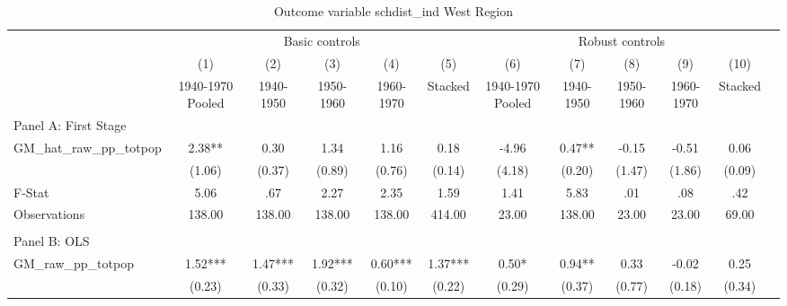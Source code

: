  \begin{table}[htbp]\centering {} \begin{threeparttable} \caption{Outcome variable schdist\_ind West Region} \begin{tabular}{l*{11}{c}} \toprule
          &\multicolumn{5}{c}{Basic controls}                                   &\multicolumn{5}{c}{Robust controls}                                  \\\cmidrule(lr){2-6}\cmidrule(lr){7-11}
          &\multicolumn{1}{c}{(1)}&\multicolumn{1}{c}{(2)}&\multicolumn{1}{c}{(3)}&\multicolumn{1}{c}{(4)}&\multicolumn{1}{c}{(5)}&\multicolumn{1}{c}{(6)}&\multicolumn{1}{c}{(7)}&\multicolumn{1}{c}{(8)}&\multicolumn{1}{c}{(9)}&\multicolumn{1}{c}{(10)}\\
          &\multicolumn{1}{c}{1940-1970 Pooled}&\multicolumn{1}{c}{1940-1950}&\multicolumn{1}{c}{1950-1960}&\multicolumn{1}{c}{1960-1970}&\multicolumn{1}{c}{Stacked}&\multicolumn{1}{c}{1940-1970 Pooled}&\multicolumn{1}{c}{1940-1950}&\multicolumn{1}{c}{1950-1960}&\multicolumn{1}{c}{1960-1970}&\multicolumn{1}{c}{Stacked}\\
\cmidrule(lr){1-11}
\multicolumn{10}{l}{Panel A: First Stage}\\
\cmidrule(lr){1-11}
GM\_hat\_raw\_pp\_totpop&      2.38** &      0.30   &      1.34   &      1.16   &      0.18   &     -4.96   &      0.47** &     -0.15   &     -0.51   &      0.06   \\
          &    (1.06)   &    (0.37)   &    (0.89)   &    (0.76)   &    (0.14)   &    (4.18)   &    (0.20)   &    (1.47)   &    (1.86)   &    (0.09)   \\
\midrule
F-Stat    &      5.06   &       .67   &      2.27   &      2.35   &      1.59   &      1.41   &      5.83   &       .01   &       .08   &       .42   \\
Observations&    138.00   &    138.00   &    138.00   &    138.00   &    414.00   &     23.00   &    138.00   &     23.00   &     23.00   &     69.00   \\
\cmidrule[\heavyrulewidth](lr){1-11} \\ \cmidrule[\heavyrulewidth](lr){1-11}
\multicolumn{10}{l}{Panel B: OLS}\\
\cmidrule(lr){1-11}
GM\_raw\_pp\_totpop&      1.52***&      1.47***&      1.92***&      0.60***&      1.37***&      0.50*  &      0.94** &      0.33   &     -0.02   &      0.25   \\
          &    (0.23)   &    (0.33)   &    (0.32)   &    (0.10)   &    (0.22)   &    (0.29)   &    (0.37)   &    (0.77)   &    (0.18)   &    (0.34)   \\

\end{tabular}
\end{threeparttable}
\end{table}
